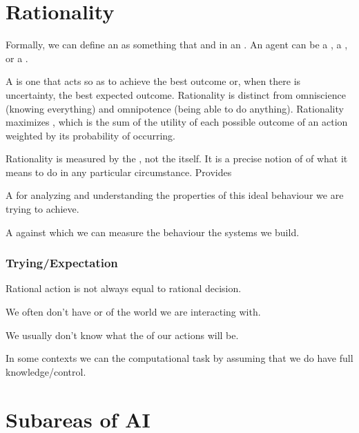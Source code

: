 \section{Rationality}

Formally, we can define an  as something that  and  in an . An agent can be a , a , or a .

A  is one that acts so as to achieve the best outcome or, when there is uncertainty, the best expected outcome. Rationality is distinct from omniscience (knowing everything) and omnipotence (being able to do anything). Rationality maximizes , which is the sum of the utility of each possible outcome of an action weighted by its probability of occurring.

Rationality is measured by the , not the  itself. It is a precise  notion of of what it means to do  in any particular circumstance. Provides
\begin{listu}
    \item A  for analyzing and understanding the properties of this ideal behaviour we are trying to achieve.
    \item A  against which we can measure the behaviour the systems we build.
\end{listu}

\subsubsection{Trying/Expectation}

Rational action is not always equal to rational decision.

\begin{listo}
    \item We often don't have  or  of the world we are interacting with.
    \item We usually don't know  what the  of our actions will be.
\end{listo}

In some contexts we can  the computational task by assuming that we do have full knowledge/control.

\section{Subareas of AI}


